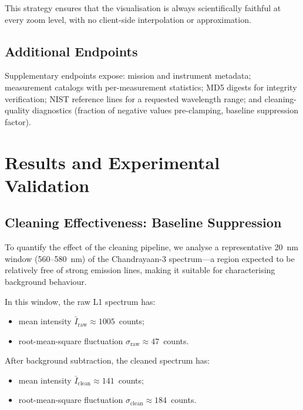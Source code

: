 \documentclass[a4paper,twocolumn,10pt]{article}
\begin{document}
This strategy ensures that the visualisation is always scientifically
faithful at every zoom level, with no client-side interpolation or
approximation.

\subsection{Additional Endpoints}

Supplementary endpoints expose: mission and instrument metadata;
measurement catalogs with per-measurement statistics; MD5 digests for
integrity verification; NIST reference lines for a requested
wavelength range; and cleaning-quality diagnostics (fraction of
negative values pre-clamping, baseline suppression factor).


\section{Results and Experimental Validation}
\label{sec:results}

\subsection{Cleaning Effectiveness: Baseline Suppression}

To quantify the effect of the cleaning pipeline, we analyse a
representative 20~nm window (560--580~nm) of the Chandrayaan-3
spectrum---a region expected to be relatively free of strong emission
lines, making it suitable for characterising background behaviour.

In this window, the raw L1 spectrum has:
\begin{itemize}[nosep,leftmargin=*]
  \item mean intensity $\bar{I}_{\text{raw}} \approx 1005$~counts;
  \item root-mean-square fluctuation
    $\sigma_{\text{raw}} \approx 47$~counts.
\end{itemize}

After background subtraction, the cleaned spectrum has:
\begin{itemize}[nosep,leftmargin=*]
  \item mean intensity $\bar{I}_{\text{clean}} \approx 141$~counts;
  \item root-mean-square fluctuation
    $\sigma_{\text{clean}} \approx 184$~counts.
\end{itemize}
\end{document}
